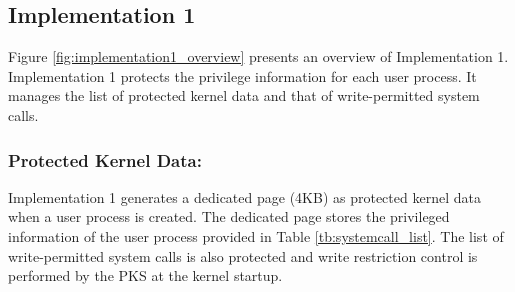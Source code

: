 \subsection{Implementation 1} \label{subsection:imp01_write_handling}

Figure \ref{fig:implementation1_overview} presents an overview of
Implementation 1. Implementation 1 protects the privilege information for each user
process.
It manages the list of protected kernel data and that of write-permitted
system calls.

\subsubsection{Protected Kernel Data:}
Implementation 1 generates a dedicated page (4KB) as protected kernel data when
a user process is created. The dedicated page stores the privileged information
of the user process provided in Table \ref{tb:systemcall_list}. 
The list of write-permitted system calls is also protected and write
restriction control is performed by the PKS at the kernel startup.

